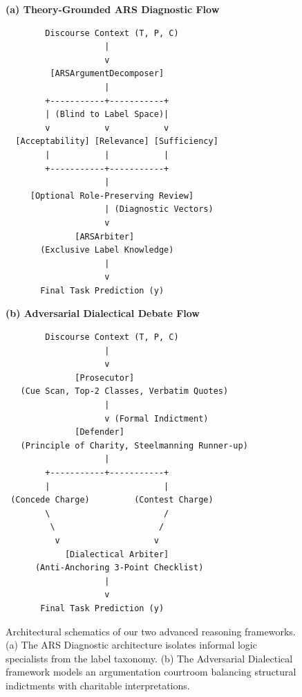 \documentclass[11pt]{article}
\begin{document}
\begin{figure}[t]
\centering
\begin{tcolorbox}[colback=gray!3!white,colframe=gray!70!black,title=\textbf{Dual Core Architectures: Theory-Grounded ARS vs. Adversarial Dialectical Debate},fonttitle=\small\bfseries,boxrule=0.6pt,arc=1.5mm,width=\textwidth]
\small
\begin{minipage}[t]{0.48\textwidth}
\centering
\textbf{(a) Theory-Grounded ARS Diagnostic Flow}
\vspace{2mm}
\begin{verbatim}
        Discourse Context (T, P, C)
                    |
                    v
         [ARSArgumentDecomposer]
                    |
        +-----------+-----------+
        | (Blind to Label Space)|
        v           v           v
  [Acceptability] [Relevance] [Sufficiency]
        |           |           |
        +-----------+-----------+
                    |
     [Optional Role-Preserving Review]
                    | (Diagnostic Vectors)
                    v
              [ARSArbiter]
       (Exclusive Label Knowledge)
                    |
                    v
       Final Task Prediction (y)
\end{verbatim}
\end{minipage}
\hfill
\begin{minipage}[t]{0.48\textwidth}
\centering
\textbf{(b) Adversarial Dialectical Debate Flow}
\vspace{2mm}
\begin{verbatim}
        Discourse Context (T, P, C)
                    |
                    v
              [Prosecutor]
   (Cue Scan, Top-2 Classes, Verbatim Quotes)
                    |
                    v (Formal Indictment)
              [Defender]
   (Principle of Charity, Steelmanning Runner-up)
                    |
        +-----------+-----------+
        |                       |
 (Concede Charge)         (Contest Charge)
        \                       /
         \                     /
          v                   v
            [Dialectical Arbiter]
      (Anti-Anchoring 3-Point Checklist)
                    |
                    v
       Final Task Prediction (y)
\end{verbatim}
\end{minipage}
\end{tcolorbox}
\caption{Architectural schematics of our two advanced reasoning frameworks. (a) The ARS Diagnostic architecture isolates informal logic specialists from the label taxonomy. (b) The Adversarial Dialectical framework models an argumentation courtroom balancing structural indictments with charitable interpretations.}
\label{fig:framework_architectures}
\end{figure}
\end{document}
